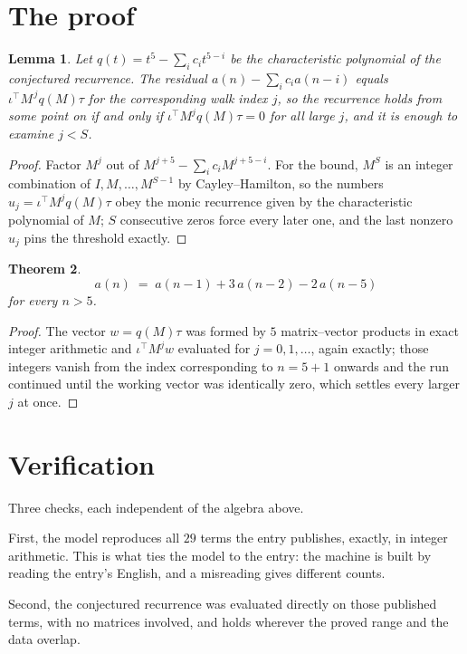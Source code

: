 \documentclass[11pt,a4paper]{article}
\theoremstyle{plain}
\newtheorem{theorem}{Theorem}
\newtheorem{lemma}[theorem]{Lemma}
\theoremstyle{definition}
\begin{document}
\section{The proof}

\begin{lemma}\label{lem:crit}
Let $q(t)=t^{5}-\sum_i c_it^{5-i}$ be the characteristic polynomial of the
conjectured recurrence. The residual $a(n)-\sum_ic_ia(n-i)$ equals
$\iota^{\!\top}M^{\,j}q(M)\tau$ for the corresponding walk index $j$, so the recurrence
holds from some point on if and only if $\iota^{\!\top}M^{j}q(M)\tau=0$ for all large $j$,
and it is enough to examine $j<S$.
\end{lemma}

\begin{proof}
Factor $M^{j}$ out of $M^{j+5}-\sum_ic_iM^{j+5-i}$. For the bound, $M^{S}$
is an integer combination of $I,M,\dots,M^{S-1}$ by Cayley--Hamilton, so the numbers
$u_j=\iota^{\!\top}M^{j}q(M)\tau$ obey the monic recurrence given by the characteristic
polynomial of $M$; $S$ consecutive zeros force every later one, and the last nonzero $u_j$
pins the threshold exactly.
\end{proof}

\begin{theorem}
\[
a(n)\;=\;a(n-1) + 3\,a(n-2) - 2\,a(n-5)
\]
for every $n>5$.
\end{theorem}

\begin{proof}
The vector $w=q(M)\tau$ was formed by $5$ matrix--vector products in exact integer
arithmetic and $\iota^{\!\top}M^{j}w$ evaluated for $j=0,1,\dots$, again exactly; those
integers vanish from the index corresponding to $n=5+1$ onwards and the run continued
until the working vector was identically zero, which settles every larger $j$ at once.
\end{proof}

\section{Verification}

Three checks, each independent of the algebra above.

First, the model reproduces all $29$ terms the entry publishes, exactly, in integer
arithmetic. This is what ties the model to the entry: the machine is built by reading the
entry's English, and a misreading gives different counts.

Second, the conjectured recurrence was evaluated directly on those published terms, with no
matrices involved, and holds wherever the proved range and the data overlap.
\end{document}
